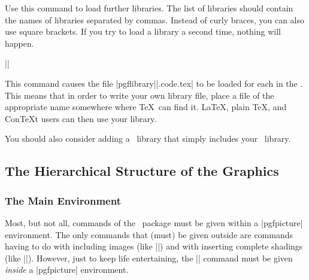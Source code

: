 \begin{command}{\usepgflibrary{}}
  Use this command to load further libraries. The list of libraries
  should contain the names of libraries separated by commas. Instead
  of curly braces, you can also use square brackets. If you try to
  load a library a second time, nothing will happen.

  \example ||

  This command causes the file
  |pgflibrary||.code.tex| to be loaded for each  in
  the . This means that in order to write your
  own library file, place a file of the appropriate name somewhere
  where \TeX\ can find it. \LaTeX, plain \TeX, and Con\TeX t
  users can then use your library.

  You should also consider adding a \tikzname\ library that simply
  includes your \pgfname\ library.
\end{command}



\subsection{The Hierarchical Structure of the Graphics}

\subsubsection{The Main Environment}


Most, but not all, commands of the \pgfname\ package must be given
within a |{pgfpicture}| environment. The only commands that (must) be
given outside are commands having to do with including images (like
|\pgfuseimage|) and with inserting complete shadings (like
|\pgfuseshading|). However, just to keep life entertaining, the
|\pgfshadepath| command must be given \emph{inside} a |{pgfpicture}|
environment.

